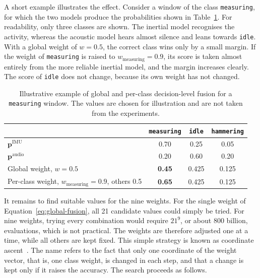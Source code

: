 A short example illustrates the effect. Consider a window of the class
\texttt{measuring}, for which the two models produce the probabilities shown in
Table~\ref{tab:fusion-example}. For readability, only three classes are shown. The
inertial model recognises the activity, whereas the acoustic model hears almost
silence and leans towards \texttt{idle}. With a global weight of $w = 0.5$, the
correct class wins only by a small margin. If the weight of \texttt{measuring} is
raised to $w_{\mathrm{measuring}} = 0.9$, its score is taken almost entirely from
the more reliable inertial model, and the margin increases clearly. The score of
\texttt{idle} does not change, because its own weight has not changed.

\begin{table}[htbp]
\centering
\small
\renewcommand{\arraystretch}{1.2}
\begin{tabular}{|l|c|c|c|}
\hline
 & \texttt{measuring} & \texttt{idle} & \texttt{hammering} \\
\hline
$\mathbf{p}^{\mathrm{IMU}}$ & 0.70 & 0.25 & 0.05 \\
$\mathbf{p}^{\mathrm{audio}}$ & 0.20 & 0.60 & 0.20 \\
\hline
Global weight, $w = 0.5$ & \textbf{0.45} & 0.425 & 0.125 \\
Per-class weight, $w_{\mathrm{measuring}} = 0.9$, others 0.5 & \textbf{0.65} & 0.425 & 0.125 \\
\hline
\end{tabular}
\caption{Illustrative example of global and per-class decision-level fusion for a
\texttt{measuring} window. The values are chosen for illustration and are not
taken from the experiments.}
\label{tab:fusion-example}
\end{table}

It remains to find suitable values for the nine weights. For the single weight of
Equation~\ref{eq:global-fusion}, all 21 candidate values could simply be tried.
For nine weights, trying every combination would require $21^9$, or about
800 billion, evaluations, which is not practical. The weights are therefore
adjusted one at a time, while all others are kept fixed. This simple strategy is
known as coordinate ascent~\cite{wright2015coordinate}. The name refers to the fact that only
one coordinate of the weight vector, that is, one class weight, is changed in
each step, and that a change is kept only if it raises the accuracy. The search
proceeds as follows.

